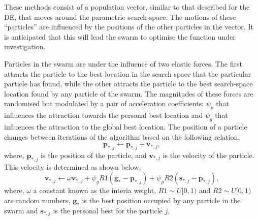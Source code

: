 These methods consist of a population vector, similar to that described for the DE, that moves around the parametric search-space.
The motions of these ``particles'' are influenced by the positions of the other particles in the vector.\autocite{poli_analysis_2008}
It is anticipated that this will lead the swarm to optimise the function under investigation.

Particles in the swarm are under the influence of two elastic forces.
The first attracts the particle to the best location in the search space that the particular particle has found, while the other attracts the particle to the best search-space location found by any particle of the swarm.
The magnitudes of these forces are randomised but modulated by a pair of acceleration coefficients; $\psi_p$ that influences the attraction towards the personal best location and $\psi_g$ that influences the attraction to the global best location.
The position of a particle changes between iterations of the algorithm based on the following relation,
%
\begin{equation}
\mathbf{p}_{*,j} \leftarrow \mathbf{p}_{*,j} + \mathbf{v}_{*,j},
\end{equation}
%
where, $\mathbf{p}_{*,j}$ is the position of the particle, and $\mathbf{v}_{*,j}$ is the velocity of the particle.
This velocity is determined as shown below,
%
\begin{equation}
\mathbf{v}_{*,j} \leftarrow \omega\mathbf{v}_{*,j} + \psi_gR1(\mathbf{g}_{*} - \mathbf{p}_{*,j}) + \psi_pR2(\mathbf{s}_{*,j} - \mathbf{p}_{*,j}),
\end{equation}
%
where, $\omega$ a constant known as the interia weight, $R1\sim U[0, 1)$ and $R2\sim U[0, 1)$ are random numbers, $\mathbf{g}_{*}$ is the best position occupied by any particle in the swarm and $\mathbf{s}_{*,j}$ is the personal best for the particle $j$.

